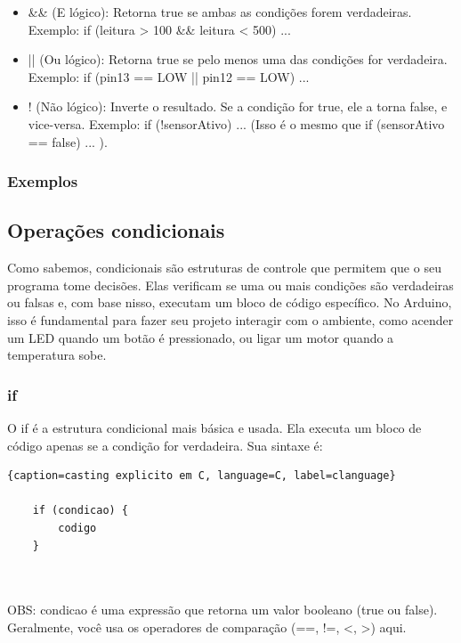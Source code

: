 \documentclass{report}
\begin{document}
	\begin{itemize}
		\item \&\& (E lógico): Retorna true se ambas as condições forem verdadeiras. Exemplo: if (leitura > 100 \&\& leitura < 500) { ... }
		\item || (Ou lógico): Retorna true se pelo menos uma das condições for verdadeira. Exemplo: if (pin13 == LOW || pin12 == LOW) { ... }
		\item ! (Não lógico): Inverte o resultado. Se a condição for true, ele a torna false, e vice-versa. Exemplo: if (!sensorAtivo) { ... } (Isso é o mesmo que if (sensorAtivo == false) { ... }).
	\end{itemize}
	
	
	\subsubsection{Exemplos}
	
	\subsection{Operações condicionais}
	Como sabemos, condicionais são estruturas de controle que permitem que o seu programa tome decisões. Elas verificam se uma ou mais condições são verdadeiras ou falsas e, com base nisso, executam um bloco de código específico. No Arduino, isso é fundamental para fazer seu projeto interagir com o ambiente, como acender um LED quando um botão é pressionado, ou ligar um motor quando a temperatura sobe.
	
	\subsubsection{if}
	O if é a estrutura condicional mais básica e usada. Ela executa um bloco de código apenas se a condição for verdadeira. Sua sintaxe é:
	
	\begin{center}
		
		\begin{lstlisting}{caption=casting explicito em C, language=C, label=clanguage}	
			
	if (condicao) {
		codigo
	}
			
			
		\end{lstlisting}
	\end{center}
	
	OBS: condicao é uma expressão que retorna um valor booleano (true ou false). Geralmente, você usa os operadores de comparação (==, !=, <, >) aqui.
	
\end{document}
